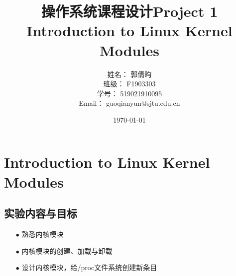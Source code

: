 \documentclass{article}
\title{\textbf{操作系统课程设计Project 1\\Introduction to Linux Kernel  Modules}} %
\author{姓名： 郭倩昀  
\\班级： F1903303  
\\学号： 519021910095  
\\Email： guoqianyun@sjtu.edu.cn} %
\date{\today} %
\begin{document}
\maketitle %
\tableofcontents
\newpage
\section{Introduction to Linux Kernel  Modules}
\subsection{实验内容与目标}
\begin{itemize}
\item[$\bullet$]熟悉内核模块
\item[$\bullet$]内核模块的创建、加载与卸载
\item[$\bullet$]设计内核模块，给/proc文件系统创建新条目
\end{itemize}
\end{document}
